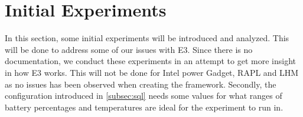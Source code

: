 \section{Initial Experiments}\label{sec:initial_experiments}

In this section, some initial experiments will be introduced and analyzed. This will be done to address some of our issues with E3. Since there is no documentation, we conduct these experiments in an attempt to get more insight in how E3 works. This will not be done for Intel power Gadget, RAPL and LHM as no issues has been observed when creating the framework. Secondly, the configuration introduced in \cref{subsec:sql} needs some values for what ranges of battery percentages and temperatures are ideal for the experiment to run in.







% 


